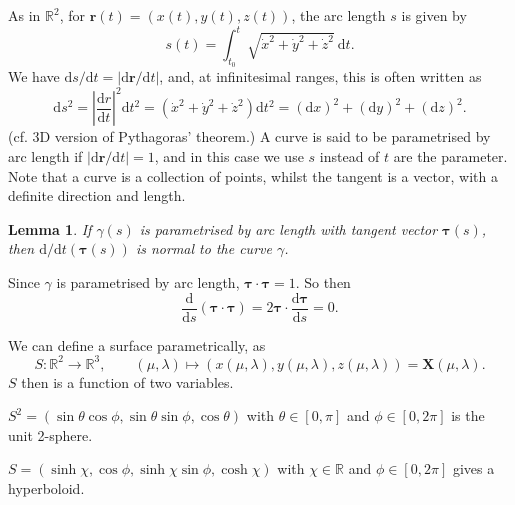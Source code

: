 \documentclass[10pt,notitlepage]{revtex4-1}
\newtheorem{lemma}[theorem]{Lemma}
\newenvironment{proof}[1][Proof]{\begin{trivlist}
\item[\hskip \labelsep {\bfseries #1}]}{\end{trivlist}}
\newenvironment{example}[1][Example]{\begin{trivlist}
\item[\hskip \labelsep {\bfseries #1}]}{\end{trivlist}}
\newcommand{\Xb}{{\boldsymbol{X}}}
\begin{document}
As in $\mathbb{R}^2$, for $\boldsymbol{r}(t)=(x(t),y(t),z(t))$, the arc length
$s$ is given by
\begin{equation}
	s(t)=\int_{t_0}^{t}\sqrt{\dot{x}^2+\dot{y}^2+\dot{z}^2}\ \mathrm{d}t.
\end{equation}
We have $\mathrm{d}s/\mathrm{d}t=|\mathrm{d}\boldsymbol{r}/\mathrm{d}t|$, and,
at infinitesimal ranges, this is often written as
\begin{equation}
	\mathrm{d}s^2=\left|\frac{\mathrm{d}r}{\mathrm{d}t}\right|^2 \mathrm{d}t^2
	=(\dot{x}^2+\dot{y}^2+\dot{z}^2)\mathrm{d}t^2
	=(\mathrm{d}x)^2+(\mathrm{d}y)^2+(\mathrm{d}z)^2.
\end{equation}
(cf. 3D version of Pythagoras' theorem.) A curve is said to be parametrised by
arc length if $|\mathrm{d}\boldsymbol{r}/\mathrm{d}t|=1$, and in this case we
use $s$ instead of $t$ are the parameter. Note that a curve is a collection of
points, whilst the tangent is a vector, with a definite direction and length.

\begin{lemma}
	If $\gamma(s)$ is parametrised by arc length with tangent vector
	$\boldsymbol{\tau}(s)$, then $\mathrm{d}/\mathrm{d}t(\boldsymbol{\tau}(s))$
	is normal to the curve $\gamma$.
\end{lemma}
\begin{proof}
	Since $\gamma$ is parametrised by arc length,
	$\boldsymbol{\tau}\cdot\boldsymbol{\tau}=1$. So then
	\begin{equation}
		\frac{\mathrm{d}}{\mathrm{d}s}(\boldsymbol{\tau}\cdot\boldsymbol{\tau})
		=2\boldsymbol{\tau}\cdot\frac{\mathrm{d}\boldsymbol{\tau}}{\mathrm{d}s}
		=0.
	\end{equation}
\end{proof}

We can define a surface parametrically, as
\begin{equation}
	S:\mathbb{R}^2\rightarrow \mathbb{R}^3,\qquad
	(\mu,\lambda)\mapsto(x(\mu,\lambda),y(\mu,\lambda),z(\mu,\lambda))
	=\Xb(\mu,\lambda).
\end{equation}
$S$ then is a function of two variables.
\begin{example}
	$S^2=(\sin\theta\cos\phi,\sin\theta\sin\phi,\cos\theta)$ with
	$\theta\in[0,\pi]$ and $\phi\in[0,2\pi]$ is the unit 2-sphere.
\end{example}
\begin{example}
	$S=(\sinh\chi,\cos\phi,\sinh\chi\sin\phi,\cosh\chi)$ with
	$\chi\in\mathbb{R}$ and $\phi\in[0,2\pi]$ gives a hyperboloid.
\end{example}
\end{document}
